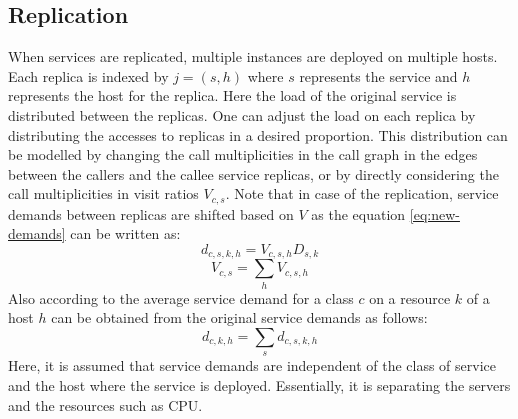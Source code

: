 \subsection{Replication} 
 When services are replicated, multiple instances are deployed on multiple hosts. Each replica is indexed by $j=(s,h)$ where $s$ represents the service and $h$ represents the host for the replica. Here the load of the original service is distributed between the replicas.
 One can adjust the load on each replica by distributing the accesses to replicas in a desired proportion. This distribution can be modelled by changing the call multiplicities in the call graph in the edges between the callers and the callee service replicas, or by directly considering the call multiplicities in visit ratios $V_{c,s}$.  
  Note that in case of the replication, service demands between replicas are shifted based on $V$ as the equation \ref{eq:new-demands} can be written as:
   \[ d_{c,s,k,h}=  V_{c,s,h} D_{s,k} \] 
   \[V_{c,s} = \sum_h V_{c,s,h} \]
   Also according to \cite{menasce1999methodology} the average service demand for a class $c$ on a resource $k$ of a host $h$ can be obtained from the original service demands as follows: 
   \[ d_{c,k,h}=\sum_s d_{c,s,k,h} \]  
  Here, it is assumed that service demands are independent of the class of service and the host where the service is deployed. Essentially, it is separating the servers and the resources such as CPU. 


